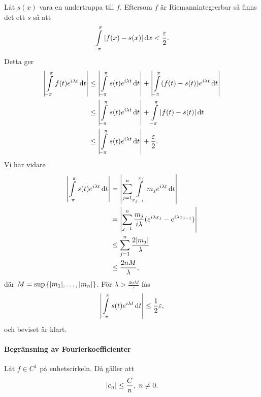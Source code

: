\proof
Låt $s(x)$ vara en undertrappa till $f$. Eftersom $f$ är Riemannintegrerbar så finns det ett $s$ så att
\begin{align*}
	\int\limits_{-\pi}^{\pi}\abs{f(x) - s(x)}\dd{x} < \frac{\varepsilon}{2}.
\end{align*}
Detta ger
\begin{align*}
	\abs{\int\limits_{-\pi}^{\pi}f(t)e^{i\lambda t}\dd{t}} &\leq \abs{\int\limits_{-\pi}^{\pi}s(t)e^{i\lambda t}\dd{t}} + \abs{\int\limits_{-\pi}^{\pi}(f(t) - s(t))e^{i\lambda t}\dd{t}} \\
	                                                 &\leq \abs{\int\limits_{-\pi}^{\pi}s(t)e^{i\lambda t}\dd{t}} + \int\limits_{-\pi}^{\pi}\abs{f(t) - s(t)}\dd{t} \\
	                                                 &\leq \abs{\int\limits_{-\pi}^{\pi}s(t)e^{i\lambda t}\dd{t}} + \frac{\varepsilon}{2}.
\end{align*}
Vi har vidare
\begin{align*}
	\abs{\int\limits_{-\pi}^{\pi}s(t)e^{i\lambda t}\dd{t}} &= \abs{\sum\limits_{j = 1}^{n}\int\limits_{x_{j - 1}}^{x_{j}}m_{j}e^{i\lambda t}\dd{t}} \\
	                                                 &= \abs{\sum\limits_{j = 1}^{n}\frac{m_{j}}{i\lambda}(e^{i\lambda x_{j}} - e^{i\lambda x_{j - 1}})} \\
	                                                 &\leq \sum\limits_{j = 1}^{n}\frac{2\abs{m_{j}}}{\lambda} \\
	                                                 &\leq \frac{2nM}{\lambda},
\end{align*}
där $M = \sup{\{\abs{m_{1}}, \dots, \abs{m_{n}}\}}$. För $\lambda > \frac{4nM}{\varepsilon}$ fås
\begin{align*}
	\abs{\int\limits_{-\pi}^{\pi}s(t)e^{i\lambda t}\dd{t}} \leq \frac{1}{2}\varepsilon,
\end{align*}
och beviset är klart.

\paragraph{Begränsning av Fourierkoefficienter}
Låt $f\in C^{1}$ på enhetscirkeln. Då gäller att
\begin{align*}
	\abs{c_{n}} \leq \frac{C}{n},\ n \neq 0.
\end{align*}

